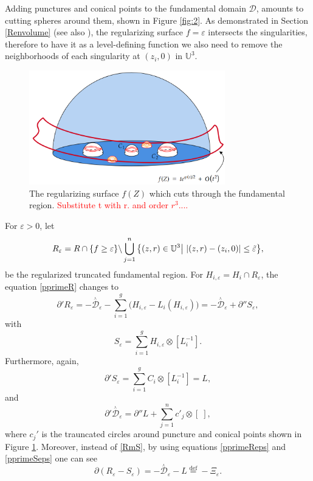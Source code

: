 \documentclass[a4paper,11pt]{article}
\newcommand{\SchottkyFund}{\mathcal{D}}
\newcommand{\singfund}{\overset{{}_{\curlywedge}}{\mathcal{D}}}
\begin{document}
Adding punctures and conical points to the fundamental domain $\SchottkyFund$, amounts to cutting spheres around them, shown in Figure \ref{fig:2}. As demonstrated in Section \ref{Renvolume} (see also \cite{park2017potentials}), the regularizing surface $f=\varepsilon$   intersects the singularities, therefore to have it as a level-defining function we also need to remove the neighborhoods of each singularity at $(z_i,0)$ in $\mathbb{U}^3$.
\begin{figure}[h]
\centering
\includegraphics[width=23em]{Pics/3.png}
\caption{The regularizing surface $f(Z)$ which cuts through the fundamental region. \textcolor{red}{Substitute t with r. and order $r^3...$.}}
\label{fig:3}
\end{figure}
For $\varepsilon>0$, let
\begin{equation}
R_{\varepsilon} = R\cap\{f\geq\varepsilon\}\backslash \bigcup_{j=1}^{n}\big{\{}(z,r)\in\mathbb{U}^3\big| ~|(z,r)-(z_i,0)| \leq \tilde{\varepsilon}\big{\}},
\end{equation}
be the regularized truncated fundamental region. For $H_{i,\varepsilon}= H_i\cap R_{\varepsilon}$, the equation \eqref{pprimeR} changes to
\begin{equation}
\partial' R_\varepsilon = -\singfund_{\varepsilon}- \sum_{i=1}^{g} \big(H_{i,\varepsilon} -L_i(H_{i,\varepsilon})\big) = -\singfund_{\varepsilon} + \partial'' S_{\varepsilon},\label{pprimeReps}
\end{equation}
with 
\begin{equation}
S_\varepsilon = \sum_{i=1}^{g} H_{i,\varepsilon} \otimes [L_i^{-1}].
\end{equation}
Furthermore, again, 
\begin{equation}
\partial'S_\varepsilon  = \sum_{i=1}^{g} C_i \otimes [L_i^{-1}] = L,\label{pprimeSeps}
\end{equation}
and 
\begin{equation}
\partial' \singfund_{\varepsilon} 
=\partial'' L  + \sum_{j=1}^{n} c'_j\otimes [\;],\label{parD}
\end{equation}
where $c_j'$ is the trauncated circles around puncture and conical points shown in Figure \ref{fig:3}. Moreover, instead of \eqref{RmS}, by using equations \eqref{pprimeReps} and \eqref{pprimeSeps} one can see
\begin{equation}
\partial (R_{\varepsilon}-S_{\varepsilon}) = -\singfund_{\varepsilon}  -L\overset{\text{def}}{=}-\Xi_{\varepsilon}.\label{RmSeps}
\end{equation} 
\end{document}
